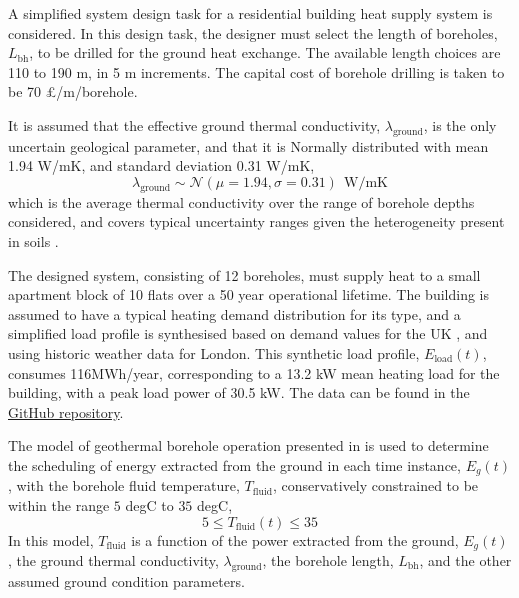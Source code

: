 A simplified  system design task for a residential building heat supply system is considered. In this design task, the designer must select the length of boreholes, $L_{\text{bh}}$, to be drilled for the ground heat exchange. The available length choices are 110 to 190 m, in 5 m increments. The capital cost of borehole drilling is taken to be 70 £/m/borehole.

It is assumed that the effective ground thermal conductivity, $\lambda_{\text{ground}}$, is the only uncertain geological parameter, and that it is Normally distributed with mean 1.94 W/mK, and standard deviation 0.31 W/mK,
\begin{equation}
    \lambda_{\text{ground}} \sim \mathcal{N}(\mu=1.94,\sigma=0.31) \:\: \text{W/mK}
\end{equation}
which is the average thermal conductivity over the range of borehole depths considered, and covers typical uncertainty ranges given the heterogeneity present in soils \citep{busby2018ModellingStudyVariation,busby2011ProvisionThermalProperties,loveridge2013ThermalResponseTesting}.

The designed  system, consisting of 12 boreholes, must supply heat to a small apartment block of 10 flats over a 50 year operational lifetime. The building is assumed to have a typical heating demand distribution for its type, and a simplified load profile is synthesised based on demand values for the UK \citep{mitchell2020UKPassivhausEnergy}, and using historic weather data for London. This synthetic load profile, $E_{\text{load}}(t)$, consumes 116MWh/year, corresponding to a 13.2 kW mean heating load for the building, with a peak load power of 30.5 kW. The data can be found in the \href{https://github.com/EECi/VOI-for-Building-Energy}{GitHub repository}.

The model of geothermal borehole operation presented in \citep{lamarche2007NewContributionFinite} is used to determine the scheduling of energy extracted from the ground in each time instance, $E_g(t)$, with the borehole fluid temperature, $T_{\text{fluid}}$, conservatively constrained to be within the range $5$ degC to $35$ degC,
\begin{equation}
    5 \leq T_{\text{fluid}}(t) \leq 35
\end{equation}
In this model, $T_{\text{fluid}}$ is a function of the power extracted from the ground, $E_g(t)$, the ground thermal conductivity, $\lambda_{\text{ground}}$, the borehole length, $L_{\text{bh}}$, and the other assumed ground condition parameters.

